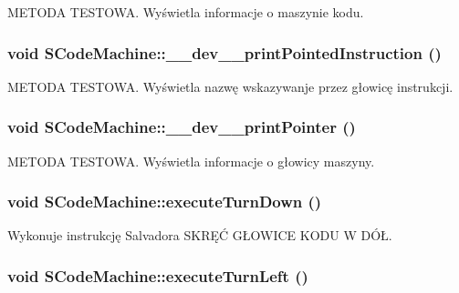 METODA TESTOWA. Wyświetla informacje o maszynie kodu. \hypertarget{classSCodeMachine_6a725d341bffacccb53431f88c62b713}{
\subsubsection[{\_\-\_\-dev\_\-\_\-printPointedInstruction}]{\setlength{\rightskip}{0pt plus 5cm}void SCodeMachine::\_\-\_\-dev\_\-\_\-printPointedInstruction ()}}
\label{classSCodeMachine_6a725d341bffacccb53431f88c62b713}


METODA TESTOWA. Wyświetla nazwę wskazywanje przez głowicę instrukcji. \hypertarget{classSCodeMachine_b4c8492fda9fe21cc2620ede3630d852}{
\subsubsection[{\_\-\_\-dev\_\-\_\-printPointer}]{\setlength{\rightskip}{0pt plus 5cm}void SCodeMachine::\_\-\_\-dev\_\-\_\-printPointer ()}}
\label{classSCodeMachine_b4c8492fda9fe21cc2620ede3630d852}


METODA TESTOWA. Wyświetla informacje o głowicy maszyny. \hypertarget{classSCodeMachine_26b7ba8981d08d594b0c37617aa85277}{
\subsubsection[{executeTurnDown}]{\setlength{\rightskip}{0pt plus 5cm}void SCodeMachine::executeTurnDown ()}}
\label{classSCodeMachine_26b7ba8981d08d594b0c37617aa85277}


Wykonuje instrukcję Salvadora SKRĘĆ GŁOWICE KODU W DÓŁ. \hypertarget{classSCodeMachine_d8415a221140a08a9383a595336cdf69}{
\subsubsection[{executeTurnLeft}]{\setlength{\rightskip}{0pt plus 5cm}void SCodeMachine::executeTurnLeft ()}}
\label{classSCodeMachine_d8415a221140a08a9383a595336cdf69}


